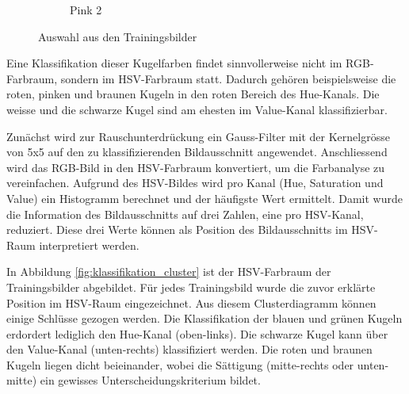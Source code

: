 \begin{figure}[h!]
\begin{subfigure}[b]{0.15\textwidth}
        \caption{Pink 2}
        \label{fig:classification_pink_ball_2}
    \end{subfigure}
    \caption{Auswahl aus den Trainingsbilder}
    \label{fig:classification_trainingdata_examples}
\end{figure}

Eine Klassifikation dieser Kugelfarben findet sinnvollerweise nicht im RGB-Farbraum, sondern im HSV-Farbraum\cite{wiki:hsv_color_space} statt.
Dadurch gehören beispielsweise die roten, pinken und braunen Kugeln in den roten Bereich des Hue-Kanals.
Die weisse und die schwarze Kugel sind am ehesten im Value-Kanal klassifizierbar.

Zunächst wird zur Rauschunterdrückung ein Gauss-Filter mit der Kernelgrösse von 5x5 auf den zu klassifizierenden Bildausschnitt angewendet.
Anschliessend wird das RGB-Bild in den HSV-Farbraum konvertiert, um die Farbanalyse zu vereinfachen.
Aufgrund des HSV-Bildes wird pro Kanal (Hue, Saturation und Value) ein Histogramm berechnet und der häufigste Wert ermittelt.
Damit wurde die Information des Bildausschnitts auf drei Zahlen, eine pro HSV-Kanal, reduziert.
Diese drei Werte können als Position des Bildausschnitts im HSV-Raum interpretiert werden.

In Abbildung \ref{fig:klassifikation_cluster} ist der HSV-Farbraum der Trainingsbilder abgebildet.
Für jedes Trainingsbild wurde die zuvor erklärte Position im HSV-Raum eingezeichnet.
Aus diesem Clusterdiagramm können einige Schlüsse gezogen werden.
Die Klassifikation der blauen und grünen Kugeln erdordert lediglich den Hue-Kanal (oben-links).
Die schwarze Kugel kann über den Value-Kanal (unten-rechts) klassifiziert werden.
Die roten und braunen Kugeln liegen dicht beieinander, wobei die Sättigung (mitte-rechts oder unten-mitte) ein gewisses Unterscheidungskriterium bildet.

